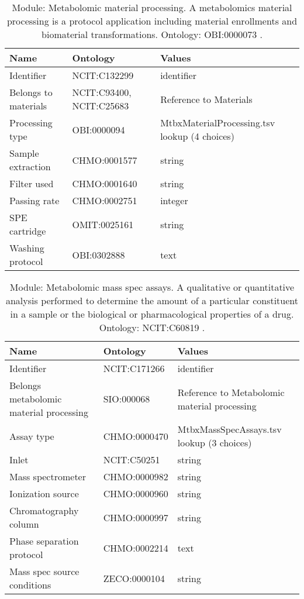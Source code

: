 \documentclass{article}
\begin{document}
\begin{table}[htb]
\begin{tabular}{lll}
Name & Ontology & Values \\
\hline
Identifier & NCIT:C132299  & identifier \\
Belongs to materials & NCIT:C93400, NCIT:C25683  & Reference to Materials \\
Processing type & OBI:0000094  & MtbxMaterialProcessing.tsv lookup (4 choices) \\
Sample extraction & CHMO:0001577  & string \\
Filter used & CHMO:0001640  & string \\
Passing rate & CHMO:0002751  & integer \\
SPE cartridge & OMIT:0025161  & string \\
Washing protocol & OBI:0302888  & text \\
\hline
\end{tabular}
\caption[Module: Metabolomic material processing]{\label{table:table17} Module: Metabolomic material processing. A metabolomics material processing is a protocol application including material enrollments and biomaterial transformations. Ontology: OBI:0000073 . }
\end{table}

\begin{table}[htb]
\begin{tabular}{lll}
Name & Ontology & Values \\
\hline
Identifier & NCIT:C171266  & identifier \\
Belongs metabolomic material processing & SIO:000068  & Reference to Metabolomic material processing \\
Assay type & CHMO:0000470  & MtbxMassSpecAssays.tsv lookup (3 choices) \\
Inlet & NCIT:C50251  & string \\
Mass spectrometer & CHMO:0000982  & string \\
Ionization source & CHMO:0000960  & string \\
Chromatography column & CHMO:0000997  & string \\
Phase separation protocol & CHMO:0002214  & text \\
Mass spec source conditions & ZECO:0000104  & string \\
\hline
\end{tabular}
\caption[Module: Metabolomic mass spec assays]{\label{table:table18} Module: Metabolomic mass spec assays. A qualitative or quantitative analysis performed to determine the amount of a particular constituent in a sample or the biological or pharmacological properties of a drug. Ontology: NCIT:C60819 . }
\end{table}
\end{document}
